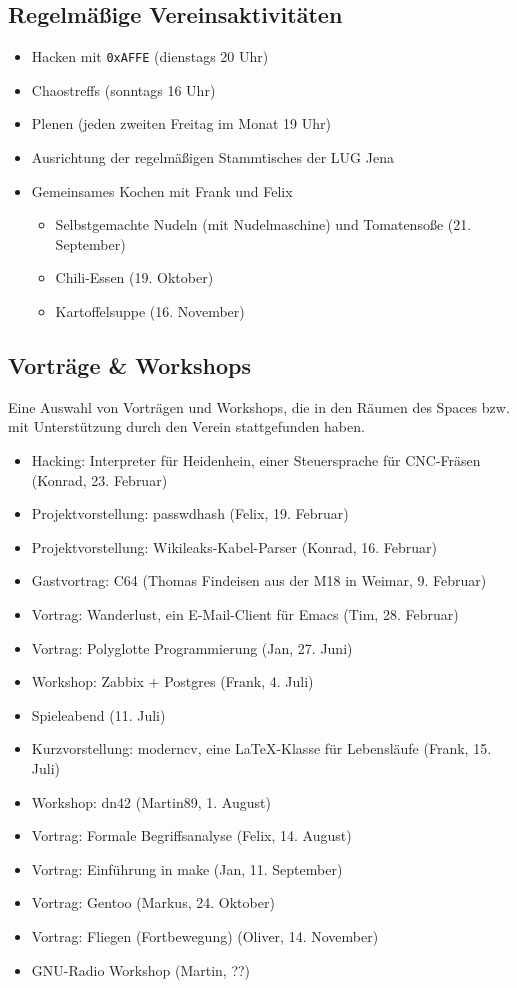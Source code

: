 \documentclass[10pt,DIV16]{scrartcl}
\begin{document}
\subsection{Regelmäßige Vereinsaktivitäten}

\begin{itemize}
	\item Hacken mit \texttt{0xAFFE} (dienstags 20 Uhr)
	\item Chaostreffs (sonntags 16 Uhr)
	\item Plenen (jeden zweiten Freitag im Monat 19 Uhr)
	\item Ausrichtung der regelmäßigen Stammtisches der LUG Jena
	\item Gemeinsames Kochen mit Frank und Felix
		\begin{itemize}
			\item Selbstgemachte Nudeln (mit Nudelmaschine) und
				Tomatensoße (21. September)
			\item Chili-Essen (19. Oktober)
			\item Kartoffelsuppe (16. November)
		\end{itemize}
\end{itemize}

\subsection{Vorträge \& Workshops}

Eine Auswahl von Vorträgen und Workshops, die in den Räumen des
Spaces bzw. mit Unterstützung durch den Verein stattgefunden haben.

\begin{itemize}
	\item Hacking:  Interpreter für Heidenhein, einer Steuersprache für CNC-Fräsen (Konrad, 23. Februar)
	\item Projektvorstellung:  passwdhash (Felix, 19. Februar)
	\item Projektvorstellung:  Wikileaks-Kabel-Parser (Konrad, 16. Februar)
	\item Gastvortrag:  C64 (Thomas Findeisen aus der M18 in Weimar, 9. Februar)
	\item Vortrag:  Wanderlust, ein E-Mail-Client für Emacs (Tim, 28. Februar)
	\item Vortrag: Polyglotte Programmierung  (Jan, 27. Juni)
	\item Workshop:  Zabbix + Postgres (Frank, 4. Juli)
	\item Spieleabend (11. Juli)
	\item Kurzvorstellung: moderncv, eine \LaTeX-Klasse für Lebensläufe (Frank, 15. Juli)
	\item Workshop:  dn42 (Martin89, 1. August)
	\item Vortrag:  Formale Begriffsanalyse (Felix, 14. August)
	\item Vortrag:  Einführung in make (Jan, 11. September)
	\item Vortrag:  Gentoo (Markus, 24. Oktober)
	\item Vortrag:  Fliegen (Fortbewegung) (Oliver, 14. November)
	\item GNU-Radio Workshop (Martin, ??)
\end{itemize}
\end{document}
